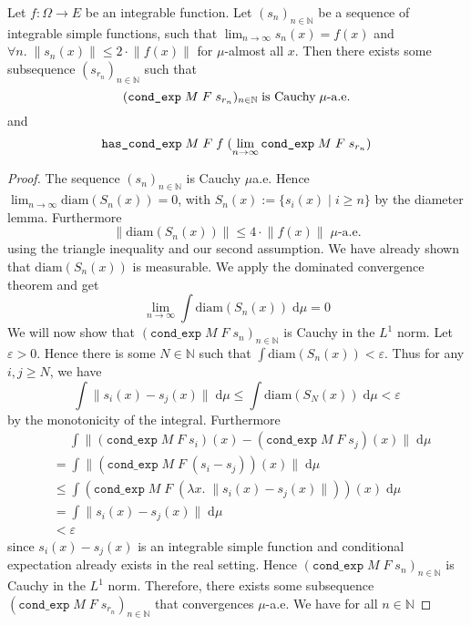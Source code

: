 \begin{lemma}
	Let $f : \Omega \rightarrow E$ be an integrable function. Let $(s_n)_{n \in \mathbb{N}}$ be a sequence of integrable simple functions, such that $\lim_{n \to \infty} s_n(x) = f(x)$ and $\forall n. \;\lVert s_n(x) \rVert \le 2 \cdot \lVert f(x) \rVert$ for $\mu$-almost all $x$. Then there exists some subsequence $(s_{r_n})_{n \in \mathbb{N}}$ such that
	\[
		\normalfont (\texttt{cond\_exp} \; M \; F \; s_{r_n})_{n \in \mathbb{N}} \; \textrm{is Cauchy} \; \mu\textrm{-a.e.}
	\]
	and
	\[
		\normalfont \texttt{has\_cond\_exp} \; M \; F \; f \; (\lim_{n \to \infty} \texttt{cond\_exp} \; M \; F \; s_{r_n})
	\]
\end{lemma}
\begin{proof}
	The sequence $(s_n)_{n \in \mathbb{N}}$ is Cauchy $\mu$a.e. Hence $\lim_{n \to \infty} \textrm{diam}(S_n(x)) = 0$, with $S_n(x) := \{s_i(x) \; \vert \; i \ge n \}$ by the diameter lemma. Furthermore
	\[
		\lVert\textrm{diam}(S_n(x))\rVert \le 4 \cdot \lVert f(x) \rVert \; \mu\textrm{-a.e.}
	\]
	using the triangle inequality and our second assumption. We have already shown that $\textrm{diam}(S_n(x))$ is measurable. We apply the dominated convergence theorem and get
	\[
		\lim_{n \to \infty} \int \textrm{diam}(S_n(x)) \; \textrm{d}\mu = 0
	\]
	We will now show that $(\texttt{cond\_exp} \; M \; F \; s_n)_{n \in \mathbb{N}}$ is Cauchy in the $L^1$ norm.
	Let $\varepsilon > 0$. Hence there is some $N \in \mathbb{N}$ such that $\int \textrm{diam}(S_n(x)) < \varepsilon$. Thus for any $i,j \ge N$, we have
	\[
		\int \lVert s_i(x) - s_j(x) \rVert \; \textrm{d}\mu \le \int \textrm{diam}(S_N(x)) \; \textrm{d}\mu < \varepsilon
	\]
	by the monotonicity of the integral. Furthermore
	\begin{align*}
		&\quad\;\int \lVert (\texttt{cond\_exp} \; M \; F \; s_i)(x) - (\texttt{cond\_exp} \; M \; F \; s_j)(x) \rVert \; \textrm{d}\mu \\
		&= \int \lVert (\texttt{cond\_exp} \; M \; F \; (s_i - s_j))(x) \rVert \; \textrm{d}\mu \\
		&\le \int (\texttt{cond\_exp} \; M \; F \; (\lambda x.\; \lVert s_i(x) - s_j(x)\rVert))(x) \; \textrm{d}\mu \\
		&= \int \lVert s_i(x) - s_j(x)\rVert \; \textrm{d}\mu \\
		&< \varepsilon
	\end{align*}
	since $s_i(x)-s_j(x)$ is an integrable simple function and conditional expectation already exists in the real setting. Hence $(\texttt{cond\_exp} \; M \; F \; s_n)_{n \in \mathbb{N}}$ is Cauchy in the $L^1$ norm. Therefore, there exists some subsequence $(\texttt{cond\_exp} \; M \; F \; s_{r_n})_{n \in \mathbb{N}}$ that convergences $\mu$-a.e. We have for all $n \in \mathbb{N}$

\end{proof}

